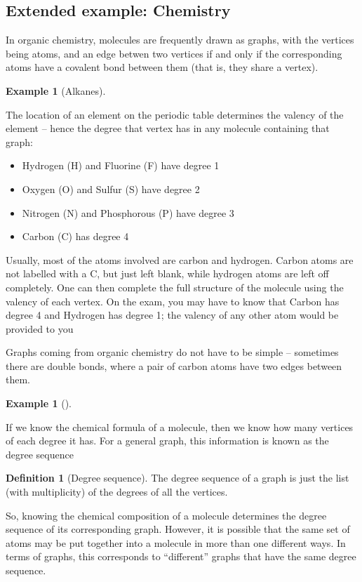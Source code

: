 \documentclass[10pt,]{book}
\theoremstyle{plain}
\theoremstyle{definition}
\newtheorem{definition}[theorem]{Definition}
\theoremstyle{definition}
\newtheorem{example}[theorem]{Example}
\theoremstyle{definition}
\begin{document}
\subsection[{Extended example: Chemistry}]{Extended example: Chemistry}\label{subsection-5}
\hypertarget{p-22}{}%
In organic chemistry, molecules are frequently drawn as graphs, with the vertices being atoms, and an edge betwen two vertices if and only if the corresponding atoms have a covalent bond between them (that is, they share a vertex).%
\begin{example}[Alkanes]\label{example-5}
\end{example}
\hypertarget{p-23}{}%
The location of an element on the periodic table determines the valency of the element -- hence the degree that vertex has in any molecule containing that graph:%
\leavevmode%
\begin{itemize}[label=\textbullet]
\item{}Hydrogen (H) and Fluorine (F) have degree 1%
\item{}Oxygen (O) and Sulfur (S) have degree 2%
\item{}Nitrogen (N) and Phosphorous (P) have degree 3%
\item{}Carbon (C) has degree 4%
\end{itemize}
\hypertarget{p-24}{}%
Usually, most of the atoms involved are carbon and hydrogen. Carbon atoms are not labelled with a C, but just left blank, while hydrogen atoms are left off completely. One can then complete the full structure of the molecule using the valency of each vertex.  On the exam, you may have to know that Carbon has degree 4 and Hydrogen has degree 1; the valency of any other atom would be provided to you%
\par
\hypertarget{p-25}{}%
Graphs coming from organic chemistry do not have to be simple – sometimes there are double bonds, where a pair of carbon atoms have two edges between them.%
\begin{example}[]\label{example-6}
\end{example}
\hypertarget{p-26}{}%
If we know the chemical formula of a molecule, then we know how many vertices of each degree it has.  For a general graph, this information is known as the degree sequence%
\begin{definition}[{Degree sequence}]\label{definition-7}
\hypertarget{p-27}{}%
The degree sequence of a graph is just the list (with multiplicity) of the degrees of all the vertices.%
\end{definition}
\hypertarget{p-28}{}%
So, knowing the chemical composition of a molecule determines the degree sequence of its corresponding graph. However, it is possible that the same set of atoms may be put together into a molecule in more than one different ways. In terms of graphs, this corresponds to “different” graphs that have the same degree sequence.%
\end{document}
